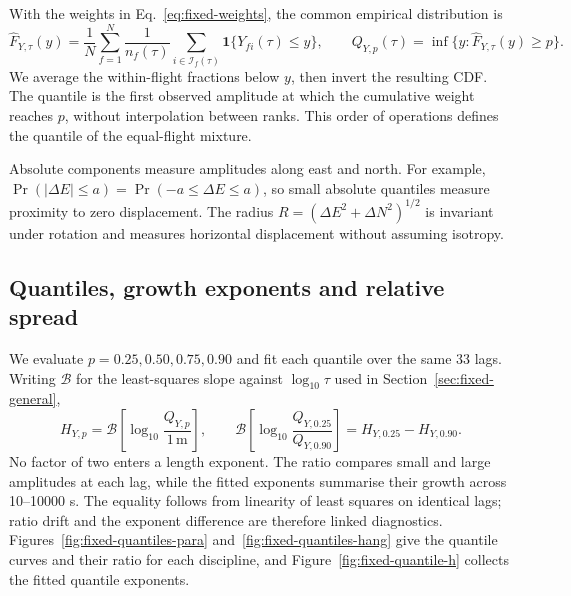 With the weights in Eq.~\eqref{eq:fixed-weights}, the common empirical distribution is
\begin{equation}
 \widehat F_{Y,\tau}(y)=\frac1N\sum_{f=1}^N\frac1{n_f(\tau)}
 \sum_{i\in\mathcal I_f(\tau)}\mathbf1\{Y_{fi}(\tau)\leq y\},\qquad
 Q_{Y,p}(\tau)=\inf\{y:\widehat F_{Y,\tau}(y)\geq p\}.
 \label{eq:fixed-cdf}
\end{equation}
We average the within-flight fractions below $y$, then invert the resulting CDF.
The quantile is the first observed amplitude at which the cumulative weight reaches
$p$, without interpolation between ranks. This order of operations defines the
quantile of the equal-flight mixture.

Absolute components measure amplitudes along east and north. For example,
$\Pr(|\Delta E|\leq a)=\Pr(-a\leq\Delta E\leq a)$, so small absolute quantiles
measure proximity to zero displacement. The radius $R=(\Delta E^2+\Delta N^2)^{1/2}$
is invariant under rotation and measures horizontal displacement without assuming
isotropy.

\subsection{Quantiles, growth exponents and relative spread}
\label{sec:fixed-quantiles}

We evaluate $p=0.25,0.50,0.75,0.90$ and fit each quantile over the same 33 lags.
Writing $\mathcal B$ for the least-squares slope against $\log_{10}\tau$
used in Section~\ref{sec:fixed-general},
\begin{equation}
 H_{Y,p}=\mathcal B\!\left[\log_{10}\frac{Q_{Y,p}}{1\,\mathrm m}\right],\qquad
 \mathcal B\!\left[\log_{10}\frac{Q_{Y,0.25}}{Q_{Y,0.90}}\right]
 =H_{Y,0.25}-H_{Y,0.90}.
 \label{eq:fixed-ratio}
\end{equation}
No factor of two enters a length exponent. The ratio compares small and large
amplitudes at each lag, while the fitted exponents summarise their growth across
10--10000 s. The equality follows from linearity of least squares on identical lags;
ratio drift and the exponent difference are therefore linked diagnostics.
Figures~\ref{fig:fixed-quantiles-para} and~\ref{fig:fixed-quantiles-hang} give the
quantile curves and their ratio for each discipline, and
Figure~\ref{fig:fixed-quantile-h} collects the fitted quantile exponents.

